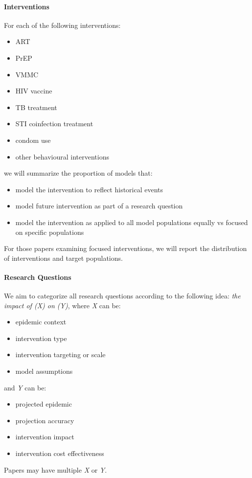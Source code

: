 \documentclass{article}
\begin{document}
\paragraph{Interventions}
For each of the following interventions:
\begin{itemize}[topsep=0pt]
  \item ART
  \item PrEP
  \item VMMC
  \item HIV vaccine
  \item TB treatment
  \item STI coinfection treatment
  \item condom use
  \item other behavioural interventions
\end{itemize}
we will summarize the proportion of models that:
\begin{itemize}[topsep=0pt]
  \item model the intervention to reflect historical events
  \item model future intervention as part of a research question
  \item model the intervention as applied to all model populations equally
        vs focused on specific populations
\end{itemize}
For those papers examining focused interventions,
we will report the distribution of interventions and target populations.
\paragraph{Research Questions}
We aim to categorize all research questions according to the following idea:
\emph{the impact of (X) on (Y)},
where \emph{X} can be:
\begin{itemize}[topsep=0pt]
  \item epidemic context
  \item intervention type
  \item intervention targeting or scale
  \item model assumptions
\end{itemize}
and \emph{Y} can be:
\begin{itemize}[topsep=0pt]
  \item projected epidemic
  \item projection accuracy
  \item intervention impact
  \item intervention cost effectiveness
\end{itemize}
Papers may have multiple \emph{X} or \emph{Y}.
\end{document}
